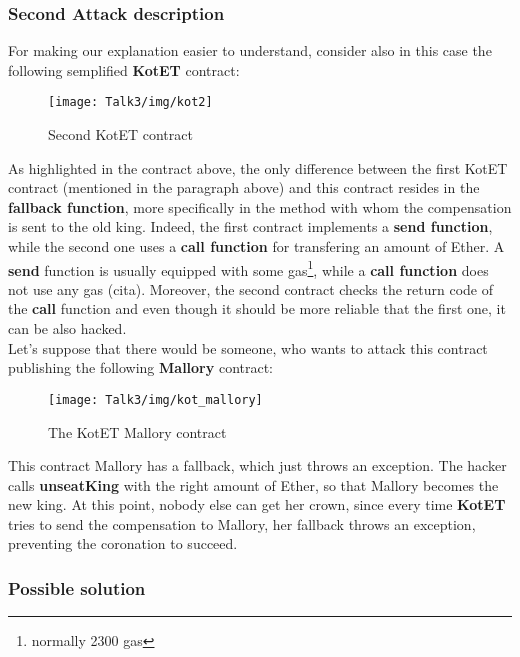 \subsubsection{Second Attack description}
For making our explanation easier to understand, consider also in this case the following semplified \textbf{KotET} contract: 
\begin{figure}[H]
\begin{center}
\texttt{[image: Talk3/img/kot2]}
\end{center}
\caption{Second KotET contract}
\label{label}
\end{figure}
As highlighted in the contract above, the only difference between the first KotET contract (mentioned in the paragraph above) and this contract resides in the \textbf{fallback function}, more specifically in the method with whom the compensation is sent to the old king. Indeed, the first contract implements a \textbf{send function}, while the second one uses a \textbf{call function} for transfering an amount of Ether. A \textbf{send} function is usually equipped with some gas\footnote{normally 2300 gas}, while a \textbf{call function} does not use any gas (cita). 
Moreover, the second contract checks the return code of the \textbf{call} function and even though it should be more reliable that the first one, it can be also hacked. \\
Let's suppose that there would be someone, who wants to attack this contract publishing the following \textbf{Mallory} contract: 
\begin{figure}[H]
\begin{center}
\texttt{[image: Talk3/img/kot\_mallory]}
\end{center}
\caption{The KotET Mallory contract}
\label{label}
\end{figure}

This contract Mallory has a fallback, which just throws an exception. The hacker calls \textbf{unseatKing} with the right amount of Ether, so that Mallory becomes the new king. 
At this point, nobody else can get her crown, since every time \textbf{KotET} tries to send the compensation to Mallory, her fallback throws an exception, preventing the coronation to succeed. 

\subsubsection{Possible solution}

